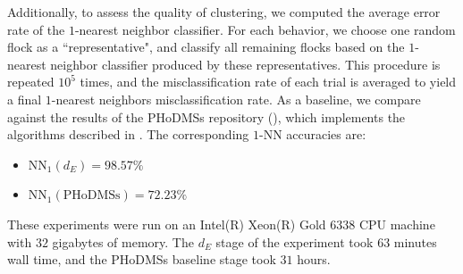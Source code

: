 \documentclass[a4paper,UKenglish,thm-restate]{article}
\theoremstyle{definition}
\begin{document}
    Additionally, to assess the quality of clustering, we computed the average error rate of the $1$-nearest neighbor classifier. For each behavior, we choose one random flock as a ``representative", and classify all remaining flocks based on the $1$-nearest neighbor classifier produced by these representatives. This procedure is repeated $10^5$ times, and the misclassification rate of each trial is averaged to yield a final $1$-nearest neighbors misclassification rate. As a baseline, we compare against the results of the PHoDMSs repository (\cite{phodmsrepo}), which implements the algorithms described in \cite{spatiotemporal}. The corresponding $1$-NN accuracies are:
    \begin{itemize}
        \item $\mathrm{NN}_1(d_E) = 98.57\%$
        \item $\mathrm{NN}_1(\mathrm{PHoDMSs}) = 72.23\%$
    \end{itemize}
    These experiments were run on an Intel(R) Xeon(R) Gold 6338 CPU machine with $32$ gigabytes of memory. The $d_E$ stage of the experiment took $63$ minutes wall time, and the PHoDMSs baseline stage took $31$ hours.
\end{document}
